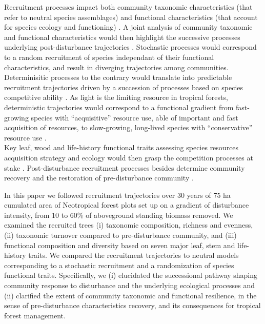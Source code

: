 \documentclass[fleqn,10pt]{ArtEcoFoG} %
\begin{document}
Recruitment processes impact both community taxonomic characteristics
(that refer to neutral species assemblages) and functional
characteristics (that account for species ecology and functioning)
\citep{Macarthur1967, Violle2007b, Kunstler2016}. A joint analysis of
community taxonomic and functional characteristics would then highlight
the successive processes underlying post-disturbance trajectories
\citep{Fukami2005, Chalmandrier2015, Cequinel2018}. Stochastic processes
would correspond to a random recruitment of species independant of their
functional characteristics, and result in diverging trajectories among
communities. Determinisitic processes to the contrary would translate
into predictable recruitment trajectories driven by a succession of
processes based on species competitive ability
\citep{Rees2001, Perronne2017}. As light is the limiting resource in
tropical forests, deterministic trajectories would correspond to a
functional gradient from fast-growing species with ``acquisitive''
resource use, able of important and fast acquisition of resources, to
slow-growing, long-lived species with ``conservative'' resource use
\citep{Denslow1980, Molino2001, Bongers2009}.\\
Key leaf, wood and life-history functional traits assessing species
resources acquisition strategy and ecology would then grasp the
competition processes at stake
\citep{Wright2004, Chave2009b, Herault2011}. Post-disturbance
recruitment processes besides determine community recovery and the
restoration of pre-disturbance community
\citep{Clements1916, Diamond1975}.

In this paper we followed recruitment trajectories over 30 years of 75
ha cumulated area of Neotropical forest plots set up on a gradient of
disturbance intensity, from 10 to 60\% of aboveground standing biomass
removed. We examined the recruited trees (i) taxonomic composition,
richness and evenness, (ii) taxonomic turnover compared to
pre-disturbance community, and (iii) functional composition and
diversity based on seven major leaf, stem and life-history traits. We
compared the recruitment trajectories to neutral models corresponding to
a stochastic recruitment and a randomization of species functional
traits. Specifically, we (i) elucidated the successional pathway shaping
community response to disturbance and the underlying ecological
processes and (ii) clarified the extent of community taxonomic and
functional resilience, in the sense of pre-disturbance characteristics
recovery, and its consequences for tropical forest management.
\end{document}
